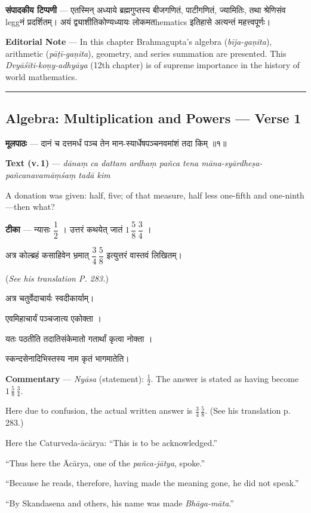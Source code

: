 \documentclass[11pt,a4paper]{article}
\newcommand{\skt}[1]{{\devanagarifont\color{sktcolor} #1}}
\newenvironment{bilingual}{%
  \par\noindent
  \begin{minipage}[t]{0.47\textwidth}%
}{%
  \par\end{minipage}%
}
\newcommand{\rightcol}{%
  \par\end{minipage}%
  \hfill
  \begin{minipage}[t]{0.47\textwidth}%
}
\begin{document}
\begin{bilingual}
\textbf{संपादकीय टिप्पणी} --- एतस्मिन् अध्याये ब्रह्मगुप्तस्य बीजगणितं, पाटीगणितं, ज्यामितिः, तथा श्रेणिसंव leggनं प्रदर्शितम्। अयं द्व्याशीतिकोण्यध्यायः लोकमतhematics इतिहासे अत्यन्तं महत्त्वपूर्णः।
\rightcol
\textbf{Editorial Note} --- In this chapter Brahmagupta's algebra (\textit{bīja-gaṇita}), arithmetic (\textit{pāṭī-gaṇita}), geometry, and series summation are presented. This \textit{Dvyāśīti-koṇy-adhyāya} (12th chapter) is of supreme importance in the history of world mathematics.
\end{bilingual}

\medskip
\noindent\rule{\textwidth}{0.4pt}

\subsection*{Algebra: Multiplication and Powers --- Verse 1}

\begin{bilingual}
\textbf{मूलपाठः} --- \skt{दानं च दत्तमर्धं पञ्च तेन मान-स्यार्धेषपञ्चनवमांशं तदा किम्} ॥१॥
\rightcol
\textbf{Text (v.\,1)} --- \textit{dānaṃ ca dattam ardhaṃ pañca tena māna-syārdheṣa-pañcanavamāṃśaṃ tadā kim}

A donation was given: half, five; of that measure, half less one-fifth and one-ninth---then what?
\end{bilingual}

\medskip

\begin{bilingual}
\textbf{टीका} --- \skt{न्यासः} $\dfrac{1}{2}$ । \skt{उत्तरं कथयेत् जातं} $1\,\dfrac{5}{8}\,\dfrac{3}{4}$ ।

\skt{अत्र कोल्ब्रहं कसाहिवेन भ्रमात्} $\dfrac{3}{4}\,\dfrac{5}{8}$ \skt{इत्युत्तरं वास्तवं लिखितम्}।

(\textit{See his translation P. 283.})

अत्र चतुर्वेदाचार्यः \skt{स्वदीकार्याम्}।

\skt{एवमिहाचार्यं पञ्चजात्य एकोक्ता} ।

\skt{यतः पठतीति तदातिसंकेमातो गतार्थां कृत्वा नोक्ता} ।

\skt{स्कन्दसेनादिभिस्तस्य नाम कृतं भागमातेति}।
\rightcol
\textbf{Commentary} --- \textit{Nyāsa} (statement): $\frac{1}{2}$. The answer is stated as having become $1\,\frac{5}{8}\,\frac{3}{4}$.

Here due to confusion, the actual written answer is $\frac{3}{4}\,\frac{5}{8}$. (See his translation p.\,283.)

Here the Caturveda-ācārya: ``This is to be acknowledged.''

``Thus here the Ācārya, one of the \textit{pañca-jātya}, spoke.''

``Because he reads, therefore, having made the meaning gone, he did not speak.''

``By Skandasena and others, his name was made \textit{Bhāga-māta}.''
\end{bilingual}
\end{document}
